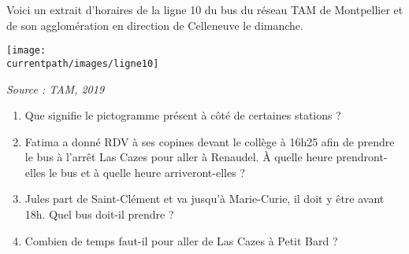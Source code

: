 \begin{exercice*}
   Voici un extrait d'horaires de la ligne 10 du bus du réseau TAM de Montpellier et de son agglomération en direction de Celleneuve le dimanche.
   \begin{center}
      \texttt{[image: \\currentpath/images/ligne10]}

      \hfill {\footnotesize\it Source : TAM, 2019}
   \end{center}
   \vspace*{-7mm}
   \begin{enumerate}
      \item Que signifie le pictogramme présent à côté de certaines stations ?
      \item Fatima a donné RDV à ses copines devant le collège à 16h25 afin de prendre le bus à l'arrêt Las Cazes pour aller à Renaudel. À quelle heure prendront-elles le bus et à quelle heure arriveront-elles ?
      \item Jules part de Saint-Clément et va jusqu'à Marie-Curie, il doit y être avant 18h. Quel bus doit-il prendre ?
      \item Combien de temps faut-il pour aller de Las Cazes à Petit Bard ?
   \end{enumerate}
\end{exercice*}
